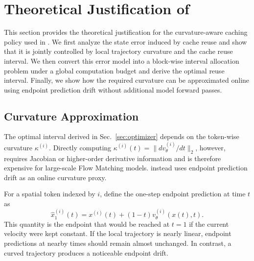 \appendix
\section{Theoretical Justification of \cubic}
\label{app:cubic_theory}

This section provides the theoretical justification for the curvature-aware
caching policy used in \cubic. We first analyze the state error induced by
cache reuse and show that it is jointly controlled by local trajectory
curvature and the cache reuse interval. We then convert this error model
into a block-wise interval allocation problem under a global computation
budget and derive the optimal reuse interval. Finally, we show how the
required curvature can be approximated online using endpoint prediction
drift without additional model forward passes.

\subsection{Curvature Approximation}
\label{app:curvature_proxy}

The optimal interval derived in Sec.~\ref{sec:optimizer} depends on the token-wise curvature $\kappa^{(i)}$. Directly computing $\kappa^{(i)}(t)=\|d v_\theta^{(i)}/dt\|_2$, however, requires Jacobian or higher-order derivative information and is therefore expensive for large-scale Flow Matching models. \cubic instead uses endpoint prediction drift as an online curvature proxy.

For a spatial token indexed by $i$, define the one-step endpoint prediction at time $t$ as
\begin{equation}
    \hat{x}_1^{(i)}(t)
    =
    x^{(i)}(t)
    +
    (1-t)
    v_\theta^{(i)}(x(t),t).
    \label{eq:app_endpoint_pred}
\end{equation}
This quantity is the endpoint that would be reached at $t=1$ if the current velocity were kept constant. If the local trajectory is nearly linear, endpoint predictions at nearby times should remain almost unchanged. In contrast, a curved trajectory produces a noticeable endpoint drift.

